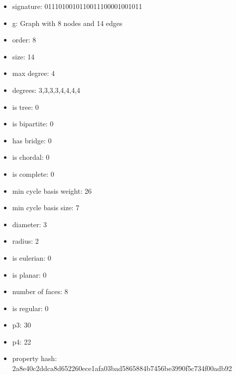 \begin{itemize}
\item signature: 0111010010110011100001001011
\item g: Graph with 8 nodes and 14 edges
\item order: 8
\item size: 14
\item max degree: 4
\item degrees: 3,3,3,3,4,4,4,4
\item is tree: 0
\item is bipartite: 0
\item has bridge: 0
\item is chordal: 0
\item is complete: 0
\item min cycle basis weight: 26
\item min cycle basis size: 7
\item diameter: 3
\item radius: 2
\item is eulerian: 0
\item is planar: 0
\item number of faces: 8
\item is regular: 0
\item p3: 30
\item p4: 22
\item property hash: 2a8e40c2ddca8d652260ece1afa03bad5865884b7456be3990f5c734f00adb92
\end{itemize}
\newpage
\begin{figure}
\end{figure}
